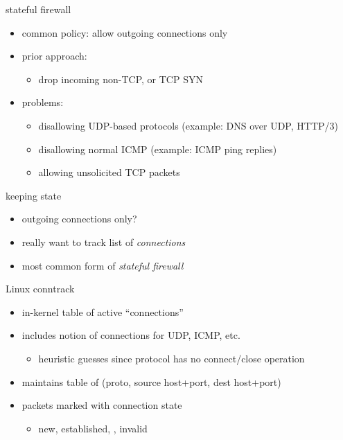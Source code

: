 \begin{frame}{stateful firewall}
    \begin{itemize}
    \item common policy: allow outgoing connections only
    \vspace{.5cm}
    \item prior approach:
        \begin{itemize}
        \item drop incoming non-TCP, or TCP SYN
        \end{itemize}
    \item problems:
        \begin{itemize}
        \item disallowing UDP-based protocols (example: DNS over UDP, HTTP/3)
        \item disallowing normal ICMP (example: ICMP ping replies)
        \item allowing unsolicited TCP packets
        \end{itemize}
    \end{itemize}
\end{frame}

\begin{frame}{keeping state}
    \begin{itemize}
    \item outgoing connections only?
    \item really want to track list of \textit{connections}
    \vspace{.5cm}
    \item most common form of \textit{stateful firewall}
    \end{itemize}
\end{frame}

\begin{frame}{Linux conntrack}
    \begin{itemize}
    \item in-kernel table of active ``connections''
    \item includes notion of connections for UDP, ICMP, etc.
        \begin{itemize}
        \item heuristic guesses since protocol has no connect/close operation
        \end{itemize}
    \item maintains table of (proto, source host+port, dest host+port)
    \item packets marked with connection state
        \begin{itemize}
        \item new, established, , invalid
        \end{itemize}
    \end{itemize}
\end{frame}

